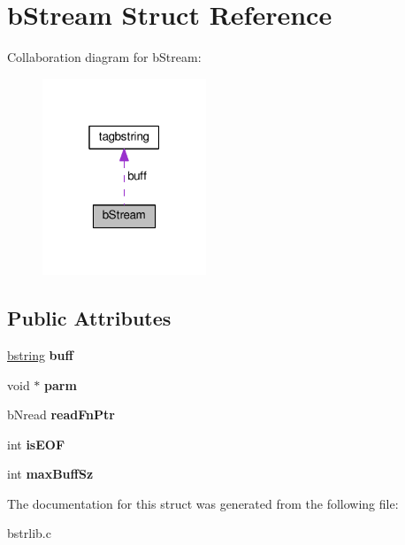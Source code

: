 \hypertarget{structbStream}{}\section{b\+Stream Struct Reference}
\label{structbStream}


Collaboration diagram for b\+Stream\+:\nopagebreak
\begin{figure}[H]
\begin{center}
\leavevmode
\includegraphics[width=139pt]{structbStream__coll__graph}
\end{center}
\end{figure}
\subsection*{Public Attributes}
\begin{DoxyCompactItemize}
\item 
\hypertarget{structbStream_aba3294390fa40724b5762adf073c1b86}{}\hyperlink{structtagbstring}{bstring} {\bfseries buff}\label{structbStream_aba3294390fa40724b5762adf073c1b86}

\item 
\hypertarget{structbStream_a43b389e3157aea7f84ba553ad7b24e3e}{}void $\ast$ {\bfseries parm}\label{structbStream_a43b389e3157aea7f84ba553ad7b24e3e}

\item 
\hypertarget{structbStream_a4279a6d91f9df1f4f3dc157d18479491}{}b\+Nread {\bfseries read\+Fn\+Ptr}\label{structbStream_a4279a6d91f9df1f4f3dc157d18479491}

\item 
\hypertarget{structbStream_a7d014819731e1d0415ba4ff92e80ffda}{}int {\bfseries is\+E\+O\+F}\label{structbStream_a7d014819731e1d0415ba4ff92e80ffda}

\item 
\hypertarget{structbStream_a952ac9807d96d9d1dc510ed4bdc8b257}{}int {\bfseries max\+Buff\+Sz}\label{structbStream_a952ac9807d96d9d1dc510ed4bdc8b257}

\end{DoxyCompactItemize}


The documentation for this struct was generated from the following file\+:\begin{DoxyCompactItemize}
\item 
bstrlib.\+c\end{DoxyCompactItemize}
